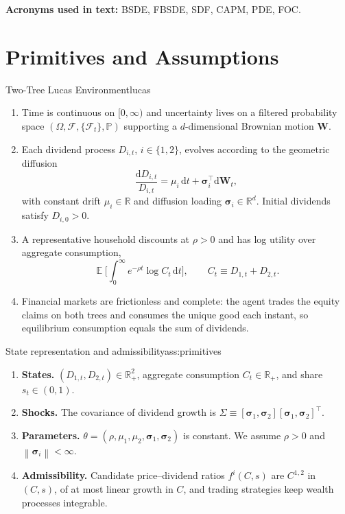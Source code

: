 ﻿\documentclass[11pt,letterpaper,oneside]{article}
\numberwithin{equation}{section}
\newcommand{\ac}[1]{{\mdseries\textsc{#1}}}
\newcommand{\printacronyms}{}
\DeclareMathOperator{\E}{\mathbb{E}}
\newcommand{\R}{\mathbb{R}}
\newcommand{\1}{\mathbf{1}}
\newcommand{\diff}{\mathrm{d}}
\newcommand{\norm}[1]{\left\lVert #1\right\rVert}
\begin{document}
\medskip
\noindent\textbf{Acronyms used in text:} \ac{BSDE}, \ac{FBSDE}, \ac{SDF}, \ac{CAPM}, \ac{PDE}, \ac{FOC}.
\medskip

\printacronyms

\clearpage
\section{Primitives and Assumptions}

\begin{assumption}{Two-Tree Lucas Environment}{lucas}
\begin{enumerate}[leftmargin=1.25em]
  \item Time is continuous on $[0,\infty)$ and uncertainty lives on a filtered probability space $(\Omega,\mathcal F,\{\mathcal F_t\},\mathbb P)$ supporting a $d$-dimensional Brownian motion $\bm W$.
  \item Each dividend process $D_{i,t}$, $i\in\{1,2\}$, evolves according to the geometric diffusion
  \begin{equation}\label{eq:dividend}
    \frac{\diff D_{i,t}}{D_{i,t}} = \mu_i\,\diff t + \bm{\sigma}_i^{\top}\diff \bm W_t,
  \end{equation}
  with constant drift $\mu_i\in\R$ and diffusion loading $\bm\sigma_i\in\R^d$. Initial dividends satisfy $D_{i,0}>0$.
  \item A representative household discounts at $\rho>0$ and has log utility over aggregate consumption,
  \[
    \E\Big[\int_0^{\infty} e^{-\rho t}\log C_t\,\diff t\Big], \qquad C_t \equiv D_{1,t}+D_{2,t}.
  \]
  \item Financial markets are frictionless and complete: the agent trades the equity claims on both trees and consumes the unique good each instant, so equilibrium consumption equals the sum of dividends.
\end{enumerate}
\end{assumption}

\begin{assumption}{State representation and admissibility}{ass:primitives}
\begin{enumerate}[label=(\roman*),itemsep=0.25em]
  \item \textbf{States.} $(D_{1,t},D_{2,t})\in\R_+^2$, aggregate consumption $C_t\in\R_+$, and share $s_t\in(0,1)$.
  \item \textbf{Shocks.} The covariance of dividend growth is $\Sigma\equiv[\bm\sigma_1,\bm\sigma_2][\bm\sigma_1,\bm\sigma_2]^{\top}$.
  \item \textbf{Parameters.} $\theta=(\rho,\mu_1,\mu_2,\bm\sigma_1,\bm\sigma_2)$ is constant. We assume $\rho>0$ and $\norm{\bm\sigma_i}<\infty$.
  \item \textbf{Admissibility.} Candidate price--dividend ratios $f^i(C,s)$ are $C^{1,2}$ in $(C,s)$, of at most linear growth in $C$, and trading strategies keep wealth processes integrable.
\end{enumerate}
\end{assumption}
\end{document}
